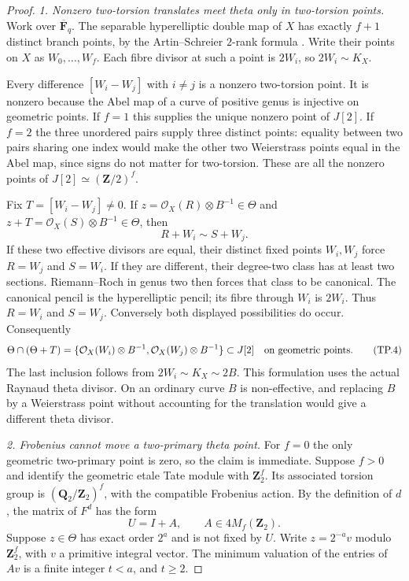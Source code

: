 \begin{proof}
\emph{1. Nonzero two-torsion translates meet theta only in
two-torsion points.}
Work over $\overline{\mathbf F}_q$. The separable hyperelliptic
double map of $X$ has exactly $f+1$ distinct branch points, by
the Artin--Schreier $2$-rank formula
\cite[Lemma~2.6]{PriesZhu2012}. Write their points on $X$ as
$W_0,\ldots,W_f$. Each fibre divisor at such a point is $2W_i$,
so $2W_i\sim K_X$.

Every difference $[W_i-W_j]$ with $i\ne j$ is a nonzero
two-torsion point. It is nonzero because the Abel map of a curve
of positive genus is injective on geometric points. If $f=1$
this supplies the unique nonzero point of $J[2]$. If $f=2$ the
three unordered pairs supply three distinct points: equality
between two pairs sharing one index would make the other two
Weierstrass points equal in the Abel map, since signs do not
matter for two-torsion. These are all the nonzero points of
$J[2]\simeq(\mathbf Z/2)^f$.

Fix $T=[W_i-W_j]\ne0$. If
$z=\mathcal O_X(R)\otimes B^{-1}\in\Theta$ and
$z+T=\mathcal O_X(S)\otimes B^{-1}\in\Theta$, then
\[
                        R+W_i\sim S+W_j.
 \tag{TP.3}
\]
If these two effective divisors are equal, their distinct fixed
points $W_i,W_j$ force $R=W_j$ and $S=W_i$. If they are
different, their degree-two class has at least two sections.
Riemann--Roch in genus two then forces that class to be canonical.
The canonical pencil is the hyperelliptic pencil; its fibre
through $W_i$ is $2W_i$. Thus $R=W_i$ and $S=W_j$.
Conversely both displayed possibilities do occur. Consequently
\[
 \Theta\cap(\Theta+T)
   =\{\mathcal O_X(W_i)\otimes B^{-1},
       \mathcal O_X(W_j)\otimes B^{-1}\}
                  \subset J[2]
 \quad\hbox{on geometric points}.
 \tag{TP.4}
\]
The last inclusion follows from $2W_i\sim K_X\sim2B$.
This formulation uses the actual Raynaud theta divisor. On an
ordinary curve $B$ is non-effective, and replacing $B$ by a
Weierstrass point without accounting for the translation would
give a different theta divisor.

\emph{2. Frobenius cannot move a two-primary theta point.}
For $f=0$ the only geometric two-primary point is zero, so the
claim is immediate. Suppose $f>0$ and identify the geometric
etale Tate module with $\mathbf Z_2^f$. Its associated torsion
group is $(\mathbf Q_2/\mathbf Z_2)^f$, with the compatible
Frobenius action. By the definition of $d$, the matrix of $F^d$
has the form
\[
                        U=I+A,\qquad A\in4M_f(\mathbf Z_2).
 \tag{TP.5}
\]
Suppose $z\in\Theta$ has exact order $2^a$ and is not fixed by
$U$. Write $z=2^{-a}v$ modulo $\mathbf Z_2^f$, with $v$ a
primitive integral vector. The minimum valuation of the entries
of $Av$ is a finite integer $t<a$, and $t\ge2$.


\end{proof}

